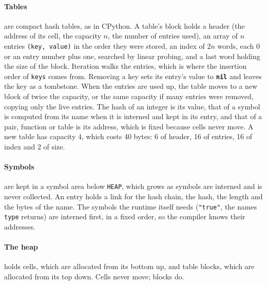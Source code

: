\documentclass[11pt,a4paper]{article}
\newcommand{\kw}[1]{\textbf{\texttt{#1}}}
\begin{document}
\paragraph{Tables} are compact hash tables, as in CPython. A table's block
holds a header (the address of its cell, the capacity $n$, the number of
entries used), an array of $n$ entries \texttt{(key, value)} in the order
they were stored, an index of $2n$ words, each 0 or an entry number
plus one, searched by linear probing, and a last word holding the size of
the block. Iteration walks the entries, which is
where the insertion order of \texttt{keys} comes from. Removing a key sets
its entry's value to \kw{nil} and leaves the key as a tombstone. When the
entries are used up, the table moves to a new block of twice the capacity,
or the same capacity if many entries were removed, copying only the live
entries. The hash of an integer is its value, that of a symbol is computed
from its name when it is interned and kept in its entry, and that of a pair,
function or table is its address, which is fixed because cells never
move. A new table has capacity 4, which costs 40 bytes: 6 of header, 16 of
entries, 16 of index and 2 of size.

\paragraph{Symbols} are kept in a symbol area below \texttt{HEAP}, which grows
as symbols are interned and is never collected. An entry holds a link for the
hash chain, the hash, the length and the bytes of the name. The
symbols the runtime itself needs (\verb|"true"|, the names \texttt{type}
returns) are interned first, in a fixed order, so the compiler knows their
addresses.

\paragraph{The heap} holds cells, which are allocated from its bottom up,
and table blocks, which are allocated from its top down. Cells never move;
blocks do.
\end{document}
